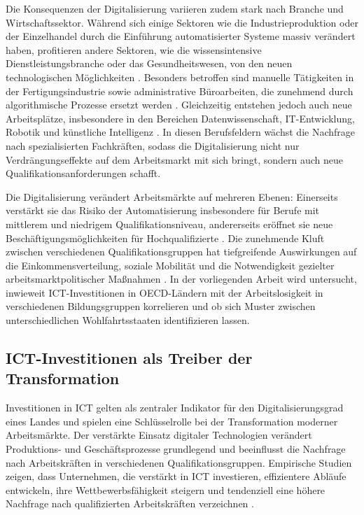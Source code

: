 Die Konsequenzen der Digitalisierung variieren zudem stark nach Branche und 
Wirtschaftssektor. Während sich einige Sektoren wie die Industrieproduktion oder der 
Einzelhandel durch die Einführung automatisierter Systeme massiv verändert haben, 
profitieren andere Sektoren, wie die wissensintensive Dienstleistungsbranche oder das 
Gesundheitswesen, von den neuen technologischen Möglichkeiten 
\parencite[S. 1555]{autor2013thegrowth}. Besonders betroffen sind manuelle Tätigkeiten in 
der Fertigungsindustrie sowie administrative Büroarbeiten, die zunehmend durch 
algorithmische Prozesse ersetzt werden \parencite[S. 260]{frey2013thefuture}. 
Gleichzeitig entstehen jedoch auch neue Arbeitsplätze, insbesondere in den Bereichen 
Datenwissenschaft, IT-Entwicklung, Robotik und künstliche Intelligenz 
\parencite[S. 2510]{goos2014explaining}. In diesen Berufsfeldern wächst die Nachfrage nach 
spezialisierten Fachkräften, sodass die Digitalisierung nicht nur Verdrängungseffekte auf 
dem Arbeitsmarkt mit sich bringt, sondern auch neue Qualifikationsanforderungen schafft.

Die Digitalisierung verändert Arbeitsmärkte auf mehreren Ebenen: Einerseits verstärkt sie 
das Risiko der Automatisierung insbesondere für Berufe mit mittlerem und niedrigem 
Qualifikationsniveau, andererseits eröffnet sie neue Beschäftigungsmöglichkeiten für 
Hochqualifizierte \parencite[S. 1555]{autor2013thegrowth}. Die zunehmende Kluft zwischen 
verschiedenen Qualifikationsgruppen hat tiefgreifende Auswirkungen auf die 
Einkommensverteilung, soziale Mobilität und die Notwendigkeit gezielter 
arbeitsmarktpolitischer Maßnahmen \parencite[S. 2510]{goos2014explaining}. In der 
vorliegenden Arbeit wird untersucht, inwieweit \ac{ICT}-Investitionen in OECD-Ländern mit 
der Arbeitslosigkeit in verschiedenen Bildungsgruppen korrelieren und ob sich Muster 
zwischen unterschiedlichen Wohlfahrtsstaaten identifizieren lassen.


\subsection{ICT-Investitionen als Treiber der Transformation}

Investitionen in \ac{ICT} gelten als zentraler Indikator für den 
Digitalisierungsgrad eines Landes und spielen eine Schlüsselrolle bei der Transformation 
moderner Arbeitsmärkte. Der verstärkte Einsatz digitaler Technologien verändert 
Produktions- und Geschäftsprozesse grundlegend und beeinflusst die Nachfrage nach 
Arbeitskräften in verschiedenen Qualifikationsgruppen. Empirische Studien zeigen, dass 
Unternehmen, die verstärkt in \ac{ICT} investieren, effizientere Abläufe entwickeln, ihre 
Wettbewerbsfähigkeit steigern und tendenziell eine höhere Nachfrage nach qualifizierten 
Arbeitskräften verzeichnen \parencite[S. 12]{corrado2018intangible}.

